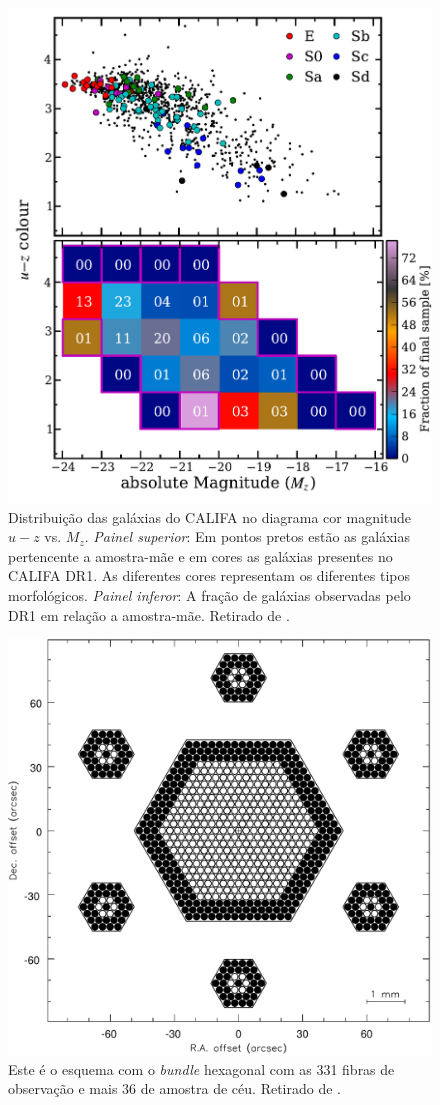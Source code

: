 \begin{figure}
    \includegraphics[height=0.5\textwidth]{figuras/figHusemann2013Fig2.pdf}
    \caption[Diagrama cor-magnitude para as galáxias do CALIFA.]
    {Distribui\c{c}\~ao das galáxias do CALIFA no diagrama cor magnitude $u-z$ vs. $M_z$. {\em Painel superior}: Em
    pontos pretos est\~ao as galáxias pertencente a amostra-m\~ae e em cores as galáxias presentes no CALIFA DR1. As
    diferentes cores representam os diferentes tipos morfológicos. {\em Painel inferor}: A fra\c{c}\~ao de galáxias
    observadas pelo DR1 em rela\c{c}\~ao a amostra-m\~ae. Retirado de \citet{Husemann2013}.}
    \label{fig:cm-uzMz}
\end{figure}

\begin{figure}
    \includegraphics[height=0.5\textwidth]{figuras/figVerheijen2004Fig5.pdf}
    \caption[Configura\c{c}\~ao do {\em bundle} de fibras do PPMAS/PPAK.]
    {Este é o esquema com o {\em bundle} hexagonal com as 331 fibras de observação e mais 36 de amostra de céu. Retirado
    de \citet{Verheijen2004}.}
    \label{fig:BundlePPAK}
\end{figure}

